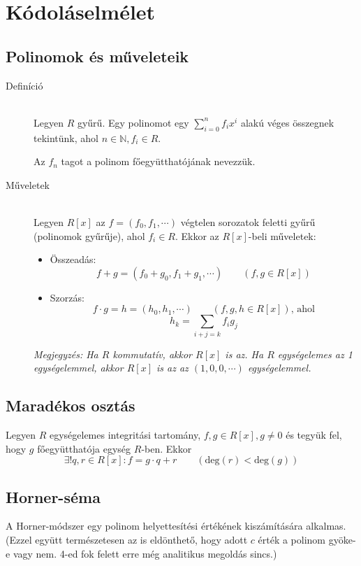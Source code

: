 \documentclass[margin=0px]{article}
\newcommand{\N}{\mathbb{N}}
\begin{document}
	\section{Kódoláselmélet}
		\subsection{Polinomok és műveleteik}
			\begin{description}
				\item[Definíció] \hfill \\
					Legyen $R$ gyűrű. Egy polinomot egy $\sum_{i=0}^{n} f_ix^i$ alakú véges összegnek tekintünk, ahol $n\in\N, f_i \in R$.
					
					Az $f_n$ tagot a polinom főegyütthatójának nevezzük.
				\item[Műveletek] \hfill \\
					Legyen $R[x]$ az $f = (f_0, f_1, \cdots)$ végtelen sorozatok feletti gyűrű (polinomok gyűrűje), ahol $f_i \in R$. Ekkor az $R[x]$-beli műveletek:
					\begin{itemize}
						\item Összeadás: \\
							\[f+g = (f_0+g_0, f_1+g_1,\cdots)\qquad (f,g \in R[x]) \]
						\item Szorzás: \\
							\[f\cdot g = h = (h_0,h_1, \cdots) \qquad (f,g,h \in R[x]) \text{, ahol} \]
							\[h_k = \sum\limits_{i+j = k}f_ig_j\]
					\end{itemize}
					
					\textit{Megjegyzés: Ha $R$ kommutatív, akkor $R[x]$ is az. Ha $R$ egységelemes az 1 egységelemmel, akkor $R[x]$ is az az $(1,0,0, \cdots)$ egységelemmel.}
			\end{description}
		\subsection{Maradékos osztás}
			Legyen $R$ egységelemes integritási tartomány, $f,g\in R[x], g \neq 0$ és tegyük fel, hogy $g$ főegyütthatója egység $R$-ben. Ekkor
			\[ \exists! q,r \in R[x] : f = g\cdot q+r \qquad (\text{deg}(r) < \text{deg}(g) )\]
			 
		\subsection{Horner-séma}
			A Horner-módszer egy polinom helyettesítési értékének kiszámítására alkalmas. (Ezzel együtt természetesen az is eldönthető, hogy adott $c$ érték a polinom gyöke-e vagy nem. 4-ed fok felett erre még analitikus megoldás sincs.)
			
\end{document}
